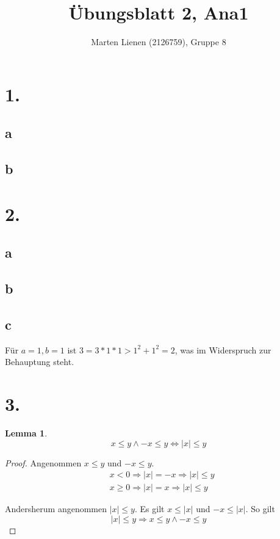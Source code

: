 \documentclass[a4paper,10pt]{article}
\title{Übungsblatt 2, Ana1}
\author{Marten Lienen (2126759), Gruppe 8}
\newtheorem*{lemma}{Lemma}
\begin{document}
\maketitle

\section*{1.}

\subsection*{a}

\subsection*{b}

\section*{2.}

\subsection*{a}

\subsection*{b}

\subsection*{c}

Für $a = 1, b = 1$ ist $3 = 3 * 1 * 1 > 1^2 + 1^2 = 2$, was im Widerspruch zur Behauptung steht.

\section*{3.}

\begin{lemma}
 \begin{equation*}
  x \le y \land -x \le y \Leftrightarrow |x| \le y
 \end{equation*}
\end{lemma}

\begin{proof}
 Angenommen $x \le y$ und $-x \le y$.
 \begin{align*}
  & x < 0 \Rightarrow |x| = -x \Rightarrow |x| \le y\\
  & x \ge 0 \Rightarrow |x| = x \Rightarrow |x| \le y
 \end{align*}

 Andersherum angenommen $|x| \le y$. Es gilt $x \le |x|$ und $-x \le |x|$. So gilt
 \begin{equation*}
  |x| \le y \Rightarrow x \le y \land -x \le y
 \end{equation*}
\end{proof}
\end{document}
